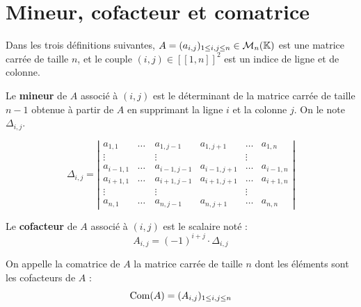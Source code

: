 \documentclass[12pt, a4paper]{report}
\begin{document}
\section{Mineur, cofacteur et comatrice}

Dans les trois définitions suivantes, $A = (a_{i,j})_{1 \le i,j \le n} \in \mathcal M_n(\mathbb{K})$ est une matrice carrée de taille $n$, et le couple $(i,j) \in [\![1,n]\!]^2$ est un indice de ligne et de colonne.

\begin{definition}[Mineur]
    Le \textbf{mineur} de $A$ associé à $(i,j)$ est le déterminant de la matrice carrée de taille $n-1$ obtenue à partir de $A$ en supprimant la ligne $i$ et la colonne $j$. On le note $\Delta_{i,j}$.

    $$\Delta_{i,j} = \left|\begin{matrix}
    a_{1,1} & \dots & a_{1,j-1} & a_{1,j+1} & \dots & a_{1,n} \\ \vdots & \quad & \vdots & \quad & \vdots \\ a_{i-1,1} & \dots & a_{i-1,j-1} & a_{i-1,j+1} & \dots & a_{i-1,n} \\ a_{i+1,1} & \dots & a_{i+1,j-1} & a_{i+1,j+1} & \dots & a_{i+1,n} \\ \vdots & \quad & \vdots & \quad & \vdots \\ a_{n,1} & \dots & a_{n,j-1} & a_{n,j+1} & \dots & a_{n,n}
    \end{matrix}\right|$$
\end{definition}

\begin{definition}[Cofacteur]
    Le \textbf{cofacteur} de $A$ associé à $(i,j)$ est le scalaire noté :
    $$A_{i,j} = (-1)^{i+j} \cdot \Delta_{i,j}$$
\end{definition}

\begin{definition}[Comatrice]
    On appelle la comatrice de $A$ la matrice carrée de taille $n$ dont les éléments sont les cofacteurs de $A$ :
    $$\mathrm{Com}(A) = (A_{i,j})_{1 \le i,j \le n}$$
\end{definition}
\end{document}
